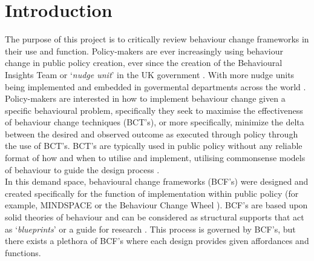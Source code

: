 \documentclass[titlepage,onecolumn,showpacs,nofootinbib,aps,superscriptaddress,eqsecnum,prd,notitlepage,showkeys,12pt]{article}
\author[1,3]{Krishane Patel}
\author[2,3]{Magda Osman}
\author[1]{Susan Michie}
\affil[1]{Clinical, Educational and Health Psycholgy, University College London}
\affil[2]{Queen Mary University, London, UK}
\affil[3]{Food Standards Agency, London, UK}
\date{}
\begin{document}
\flushbottom
\maketitle
%
%
\section{Introduction}
The purpose of this project is to critically review behaviour change frameworks in their use and function. Policy-makers are ever increasingly using behaviour change in public policy creation, ever since the creation of the Behavioural Insights Team or `\textit{nudge unit}' in the UK government \citep{MINDSPACE}. With more nudge units being implemented and embedded in govermental departments across the world \citep{shafir2013behavioral}.\\
\indent Policy-makers are interested in how to implement behaviour change given a specific behavioural problem, specifically they seek to maximise the effectiveness of behaviour change techniques (BCT's), or more specifically, minimize the delta between the desired and observed outcome as executed through policy through the use of BCT's. BCT's are typically used in public policy without any reliable format of how and when to utilise and implement, utilising commonsense models of behaviour to guide the design process \citep{michie2009specifying}.\\
\indent In this demand space, behavioural change frameworks (BCF's) were designed and created specifically for the function of implementation within public policy (for example, MINDSPACE \citep{MINDSPACE} or the Behaviour Change Wheel \citep{BCW}). BCF's are based upon solid theories of behaviour \citep{adom2018theoretical} and can be considered as structural supports that act as `\textit{blueprints}' or a guide for research \citep{grant2014understanding}.
This process is governed by BCF's, but there exists a plethora of BCF's where each design provides given affordances and functions.
\end{document}

